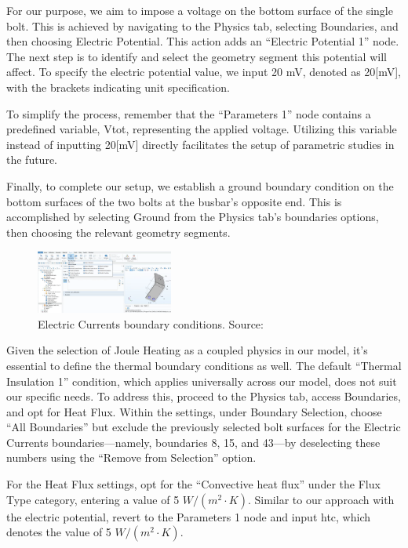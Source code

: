 For our purpose, we aim to impose a voltage on the bottom surface of the single bolt. This is achieved by navigating to the Physics tab, selecting Boundaries, and then choosing Electric Potential. This action adds an ``Electric Potential 1'' node. The next step is to identify and select the geometry segment this potential will affect. To specify the electric potential value, we input 20 mV, denoted as 20[mV], with the brackets indicating unit specification.

To simplify the process, remember that the ``Parameters 1'' node contains a predefined variable, Vtot, representing the applied voltage. Utilizing this variable instead of inputting 20[mV] directly facilitates the setup of parametric studies in the future.

Finally, to complete our setup, we establish a ground boundary condition on the bottom surfaces of the two bolts at the busbar's opposite end. This is accomplished by selecting Ground from the Physics tab's boundaries options, then choosing the relevant geometry segments.

\begin{figure}[ht!]
  \centering
  \includegraphics[width=0.4\textwidth]{Chapters/Figures/Chapter 3 Figures/Electric Currents Boundary Conditions.png}
  \caption{Electric Currents boundary conditions. Source: \cite{multiphysics__modeling_nodate}}
  \label{fig:Electric Currents boundary conditions}
\end{figure}

Given the selection of Joule Heating as a coupled physics in our model, it's essential to define the thermal boundary conditions as well. The default ``Thermal Insulation 1'' condition, which applies universally across our model, does not suit our specific needs. To address this, proceed to the Physics tab, access Boundaries, and opt for Heat Flux. Within the settings, under Boundary Selection, choose ``All Boundaries'' but exclude the previously selected bolt surfaces for the Electric Currents boundaries—namely, boundaries 8, 15, and 43—by deselecting these numbers using the ``Remove from Selection'' option.

For the Heat Flux settings, opt for the ``Convective heat flux'' under the Flux Type category, entering a value of 5 $W/(m^2\cdot K)$. Similar to our approach with the electric potential, revert to the Parameters 1 node and input htc, which denotes the value of 5 $W/(m^2\cdot K)$.

